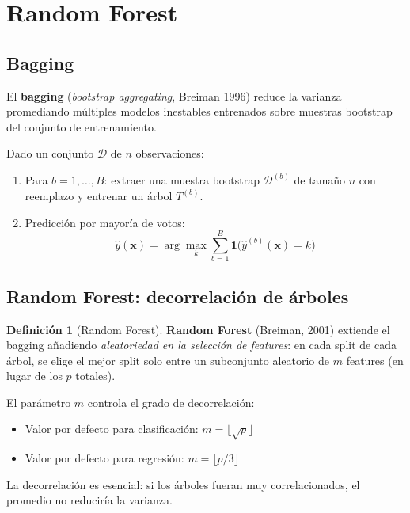 \documentclass[12pt, a4paper]{article}
\theoremstyle{definition}
\newtheorem{definicion}{Definición}[section]
\theoremstyle{plain}
\theoremstyle{remark}
\newcommand{\bx}{\bm{x}}
\begin{document}
\section{Random Forest}

\subsection{Bagging}

El \textbf{bagging} (\textit{bootstrap aggregating}, Breiman 1996) reduce la varianza promediando múltiples modelos inestables entrenados sobre muestras bootstrap del conjunto de entrenamiento.

Dado un conjunto $\mathcal{D}$ de $n$ observaciones:
\begin{enumerate}
  \item Para $b = 1, \ldots, B$: extraer una muestra bootstrap $\mathcal{D}^{(b)}$ de tamaño $n$ con reemplazo y entrenar un árbol $T^{(b)}$.
  \item Predicción por mayoría de votos:
  \[
    \hat{y}(\bx) = \arg\max_k \sum_{b=1}^{B} \mathbf{1}\bigl(\hat{y}^{(b)}(\bx) = k\bigr)
  \]
\end{enumerate}

\subsection{Random Forest: decorrelación de árboles}

\begin{definicion}[Random Forest]
  \textbf{Random Forest} (Breiman, 2001) extiende el bagging añadiendo \emph{aleatoriedad en la selección de features}: en cada split de cada árbol, se elige el mejor split solo entre un subconjunto aleatorio de $m$ features (en lugar de los $p$ totales).
\end{definicion}

El parámetro $m$ controla el grado de decorrelación:
\begin{itemize}
  \item Valor por defecto para clasificación: $m = \lfloor\sqrt{p}\rfloor$
  \item Valor por defecto para regresión: $m = \lfloor p/3 \rfloor$
\end{itemize}

La decorrelación es esencial: si los árboles fueran muy correlacionados, el promedio no reduciría la varianza.
\end{document}
